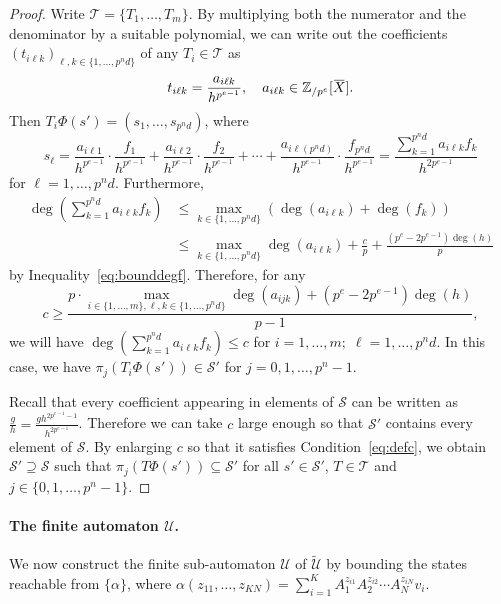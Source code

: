 \documentclass[letterpaper, 11pt, thm-restate]{article}
\numberwithin{equation}{section}
\newcommand{\Zpe}{\mathbb{Z}_{/p^e}}
\newcommand{\mT}{\mathcal{T}}
\newcommand{\mS}{\mathcal{S}}
\newcommand{\mmU}{\mathscr{U}}
\newcommand{\tU}{\widetilde{\mathscr{U}}}
\newcommand{\oX}{\mkern 1.5mu\overline{\mkern-1.5mu X \mkern-1.5mu}\mkern 1.5mu}
\theoremstyle{definition}
\theoremstyle{definition}
\theoremstyle{definition}
\begin{document}
\begin{proof}
    Write $\mT = \{T_1, \ldots, T_m\}$.
    By multiplying both the numerator and the denominator by a suitable polynomial, we can write out the coefficients $(t_{i\ell k})_{\ell, k \in \{1, \ldots, p^n d\}}$ of any $T_i \in \mT$ as
    \[
    t_{i\ell k} = \frac{a_{i\ell k}}{h^{p^{e-1}}}, \quad a_{i\ell k} \in \Zpe[\oX].
    \]
    Then $T_i \Phi(s') = (s_1, \ldots, s_{p^n d})$, where
    \[
    s_\ell = \frac{a_{i\ell1}}{h^{p^{e-1}}} \cdot \frac{f_1}{h^{p^{e-1}}} + \frac{a_{i\ell2}}{h^{p^{e-1}}} \cdot \frac{f_2}{h^{p^{e-1}}} + \cdots + \frac{a_{i\ell(p^nd)}}{h^{p^{e-1}}} \cdot \frac{f_{p^nd}}{h^{p^{e-1}}} = \frac{\sum_{k = 1}^{p^nd} a_{i\ell k} f_k}{h^{2p^{e-1}}}
    \]
    for $\ell = 1, \ldots, p^n d$.
    Furthermore,
    \begin{align*}
        \deg\left(\sum_{k = 1}^{p^nd} a_{i\ell k} f_k\right) & \leq \max_{k \in \{1, \ldots, p^n d\}} \left(\deg(a_{i\ell k}) + \deg(f_k)\right) \\
        & \leq \max_{k \in \{1, \ldots, p^n d\}} \deg(a_{i\ell k}) + \frac{c}{p} + \frac{(p^e - 2p^{e-1})\deg(h)}{p}
    \end{align*}
    by Inequality~\eqref{eq:bounddegf}.  
    Therefore, for any
    \begin{equation}\label{eq:defc}
        c \geq \frac{p \cdot\max_{i \in \{1, \ldots, m\}, \ell, k \in \{1, \ldots, p^n d\}}\deg(a_{ijk}) + (p^e - 2p^{e-1})\deg(h)}{p - 1},
    \end{equation}
    we will have $\deg\left(\sum_{k = 1}^{p^nd} a_{i\ell k} f_k\right) \leq c$ for $i = 1, \ldots, m;\; \ell = 1, \ldots, p^n d$.
    In this case, we have $\pi_j(T_i\Phi(s')) \in \mS'$ for $j = 0, 1, \ldots, p^n -1$.

    Recall that every coefficient appearing in elements of $\mS$ can be written as $\frac{g}{h} = \frac{g h^{2p^{e-1} - 1}}{h^{2p^{e-1}}}$.
    Therefore we can take $c$ large enough so that $\mS'$ contains every element of $\mS$.
    By enlarging $c$ so that it satisfies Condition~\eqref{eq:defc}, we obtain $\mS' \supseteq \mS$ such that $\pi_j(T\Phi(s')) \subseteq \mS'$ for all $s' \in \mS'$, $T \in \mT$ and $j \in \{0, 1, \ldots, p^n-1\}$.
\end{proof}

\paragraph{The finite automaton $\mmU$.}
We now construct the finite sub-automaton $\mmU$ of $\tU$ by bounding the states reachable from $\{\alpha\}$, where
$
\alpha(z_{11}, \ldots, z_{KN}) = \sum_{i = 1}^K A_1^{z_{i1}} A_2^{z_{i2}} \cdots A_N^{z_{iN}} v_i
$.
\end{document}
